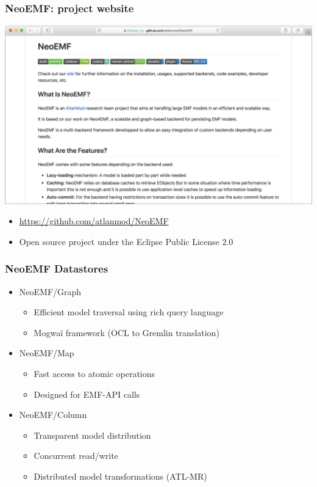 \documentclass[10pt]{beamer}
\begin{document}
\begin{frame}[t]\frametitle{NeoEMF: project website}
  \begin{center}
    \includegraphics[width=\textwidth]{neoemf-github.png}
  \end{center}
	
  \begin{itemize}
  \item \url{https://github.com/atlanmod/NeoEMF}
  \item Open source project under the Eclipse Public License 2.0
  \end{itemize}
\end{frame}

\begin{frame}[c]\frametitle{NeoEMF Datastores~\cite{DBLP:conf/models/DanielSBTVGC16}}
	\begin{itemize}
	\item NeoEMF/Graph
		\begin{itemize}
		\item Efficient model traversal using rich query language
		\item Mogwaï framework (OCL to Gremlin translation)
		\end{itemize}
	\item NeoEMF/Map
		\begin{itemize}
		\item Fast access to atomic operations
		\item Designed for EMF-API calls
		\end{itemize}
	\item NeoEMF/Column
		\begin{itemize}
		\item Transparent model distribution
		\item Concurrent read/write
		\item Distributed model transformations (ATL-MR)
		\end{itemize}
	\end{itemize}
\end{frame}
\end{document}
